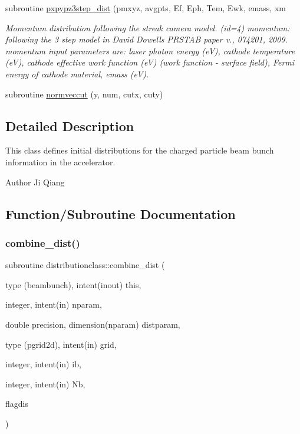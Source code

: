 \begin{DoxyCompactItemize}
subroutine \mbox{\hyperlink{namespacedistributionclass_aaeb585c7c5a8664f047fb95fc7721059}{pxpypz3step\+\_\+dist}} (pmxyz, avgpts, Ef, Eph, Tem, Ewk, emass, xm
\begin{DoxyCompactList}\small\item\em Momentum distribution following the streak camera model. (id=4) momentum\+: following the 3 step model in David Dowell\textquotesingle{}s P\+R\+S\+T\+AB paper v., 074201, 2009. momentum input parameters are\+: laser photon energy (eV), cathode temperature (eV), cathode effective work function (eV) (work function -\/ surface field), Fermi energy of cathode material, emass (eV). \end{DoxyCompactList}\item 
subroutine \mbox{\hyperlink{namespacedistributionclass_ae604d1dc6d7f92f0c37e00fb504d38fa}{normveccut}} (y, num, cutx, cuty)
\end{DoxyCompactItemize}


\subsection{Detailed Description}
This class defines initial distributions for the charged particle beam bunch information in the accelerator. 

\begin{DoxyAuthor}{Author}
Ji Qiang 
\end{DoxyAuthor}


\subsection{Function/\+Subroutine Documentation}
\mbox{\label{namespacedistributionclass_ae01180ba4966edba5753229ef24e5b8b}} 
\subsubsection{\texorpdfstring{combine\_dist()}{combine\_dist()}}
{\footnotesize\ttfamily subroutine distributionclass\+::combine\+\_\+dist (\begin{DoxyParamCaption}\item[{type (beambunch), intent(inout)}]{this,  }\item[{integer, intent(in)}]{nparam,  }\item[{double precision, dimension(nparam)}]{distparam,  }\item[{type (pgrid2d), intent(in)}]{grid,  }\item[{integer, intent(in)}]{ib,  }\item[{integer, intent(in)}]{Nb,  }\item[{}]{flagdis }\end{DoxyParamCaption})}




